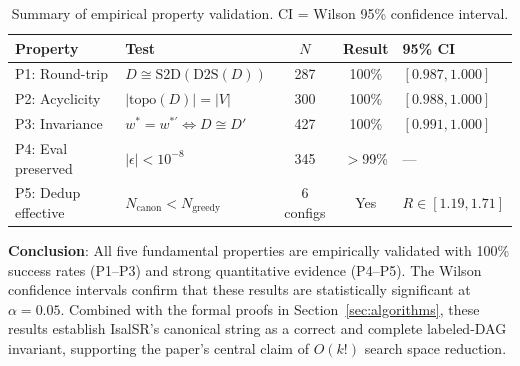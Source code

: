 \begin{table}[h]
\centering
\caption{Summary of empirical property validation. CI = Wilson 95\% confidence interval.}
\label{tab:properties}
\begin{tabular}{llccl}
\toprule
Property & Test & $N$ & Result & 95\% CI \\
\midrule
P1: Round-trip & $D \cong \text{S2D}(\text{D2S}(D))$ & 287 & 100\% & $[0.987, 1.000]$ \\
P2: Acyclicity & $|\text{topo}(D)| = |V|$ & 300 & 100\% & $[0.988, 1.000]$ \\
P3: Invariance & $w^* = w^{*\prime} \!\iff\! D \cong D'$ & 427 & 100\% & $[0.991, 1.000]$ \\
P4: Eval preserved & $|\epsilon| < 10^{-8}$ & 345 & $>$99\% & --- \\
P5: Dedup effective & $N_{\text{canon}} < N_{\text{greedy}}$ & 6 configs & Yes & $R \in [1.19, 1.71]$ \\
\bottomrule
\end{tabular}
\end{table}

\textbf{Conclusion}: All five fundamental properties are empirically validated
with 100\% success rates (P1--P3) and strong quantitative evidence (P4--P5).
The Wilson confidence intervals confirm that these results are statistically
significant at $\alpha = 0.05$. Combined with the formal proofs in
Section~\ref{sec:algorithms}, these results establish IsalSR's canonical string
as a correct and complete labeled-DAG invariant, supporting the paper's central
claim of $O(k!)$ search space reduction.
